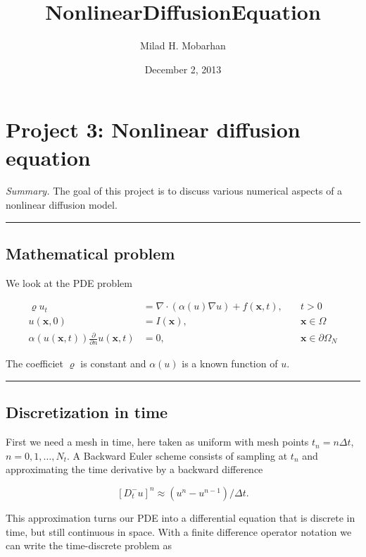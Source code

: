 \documentclass[letterpaper,10pt,english]{/usr/share/sphinx/texinputs/sphinxhowto}
\title{NonlinearDiffusionEquation }
\date{December 2, 2013}
\author{Milad H. Mobarhan}
\begin{document}
        
            \maketitle
        

        


        
        \section{Project 3: Nonlinear diffusion equation}

\emph{Summary.} The goal of this project is to discuss various numerical
aspects of a nonlinear diffusion model.\begin{center}\rule{3in}{0.4pt}\end{center}

\subsection{Mathematical problem}

We look at the PDE problem

\begin{align*}
\varrho u_t &= \nabla\cdot (\alpha (u)\nabla u) + f(\pmb{x}, t),\quad &t >0\\
u(\pmb{x},0) &= I(\pmb{x}),\quad &\pmb{x}\in\Omega\\
\alpha (u(\pmb{x},t))\frac{\partial}{\partial n} u(\pmb{x}, t) &= 0,\quad &\pmb{x}\in\partial\Omega_N
\end{align*}

The coefficiet $\varrho$ is constant and $\alpha (u)$ is a known
function of $u$.\begin{center}\rule{3in}{0.4pt}\end{center}

\subsection{Discretization in time}

First we need a mesh in time, here taken as uniform with mesh points
$t_n=n \Delta t$, $n=0,1,…,N_t$. A Backward Euler scheme consists of
sampling at $t_n$ and approximating the time derivative by a backward
difference

\[[D_t^- u]^n\approx (u^{n}-u^{n-1})/\Delta t.\]

This approximation turns our PDE into a differential equation that is
discrete in time, but still continuous in space. With a finite
difference operator notation we can write the time-discrete problem as
\end{document}
